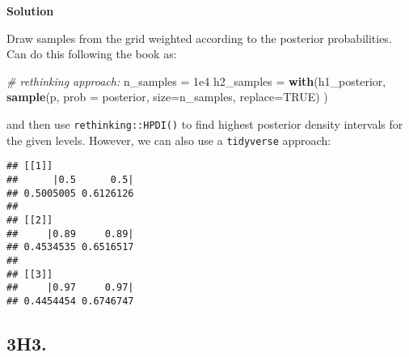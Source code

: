 \documentclass[
]{book}
\newenvironment{Shaded}{\begin{snugshade}}{\end{snugshade}}
\newcommand{\CommentTok}[1]{\textcolor[rgb]{0.56,0.35,0.01}{\textit{#1}}}
\newcommand{\DataTypeTok}[1]{\textcolor[rgb]{0.13,0.29,0.53}{#1}}
\newcommand{\FloatTok}[1]{\textcolor[rgb]{0.00,0.00,0.81}{#1}}
\newcommand{\KeywordTok}[1]{\textcolor[rgb]{0.13,0.29,0.53}{\textbf{#1}}}
\newcommand{\NormalTok}[1]{#1}
\newcommand{\OperatorTok}[1]{\textcolor[rgb]{0.81,0.36,0.00}{\textbf{#1}}}
\newcommand{\OtherTok}[1]{\textcolor[rgb]{0.56,0.35,0.01}{#1}}
\newcommand{\StringTok}[1]{\textcolor[rgb]{0.31,0.60,0.02}{#1}}
\begin{document}
\textbf{Solution}

Draw samples from the grid weighted according to the posterior probabilities. Can do this following the book as:

\begin{Shaded}
\begin{Highlighting}[]
\CommentTok{# rethinking approach:}
\NormalTok{n_samples =}\StringTok{ }\FloatTok{1e4}
\NormalTok{h2_samples =}\StringTok{ }\KeywordTok{with}\NormalTok{(h1_posterior, }
               \KeywordTok{sample}\NormalTok{(p, }\DataTypeTok{prob =}\NormalTok{ posterior, }\DataTypeTok{size=}\NormalTok{n_samples, }\DataTypeTok{replace=}\OtherTok{TRUE}\NormalTok{) )}
\end{Highlighting}
\end{Shaded}

and then use \texttt{rethinking::HPDI()} to find highest posterior density intervals for the given levels. However, we can also use a \texttt{tidyverse} approach:

\begin{Shaded}
\end{Shaded}

\begin{verbatim}
## [[1]]
##      |0.5      0.5| 
## 0.5005005 0.6126126 
## 
## [[2]]
##     |0.89     0.89| 
## 0.4534535 0.6516517 
## 
## [[3]]
##     |0.97     0.97| 
## 0.4454454 0.6746747
\end{verbatim}

\hypertarget{h3.}{%
\subsection{3H3.}\label{h3.}}
\end{document}
